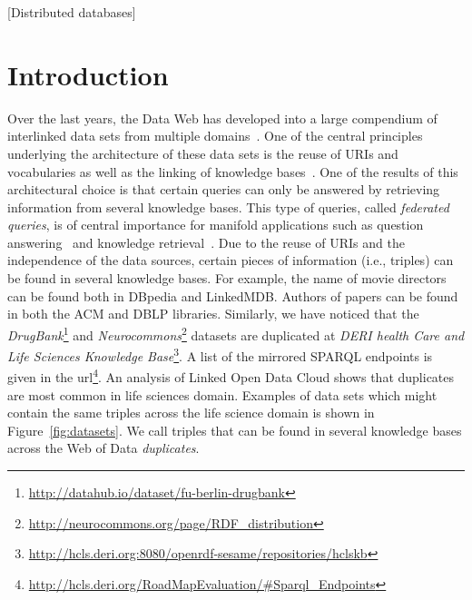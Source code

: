 \documentclass{sig-alternate}  %
\begin{document}
[Distributed databases]



\section{Introduction}
Over the last years, the Data Web has developed into a large compendium of interlinked data sets from multiple domains~\cite{key-14}. 
One of the central principles underlying the architecture of these data sets is the reuse of URIs and vocabularies as well as the linking of knowledge bases~\cite{key-20}.
One of the results of this architectural choice is that certain queries can only be answered by retrieving information from several knowledge bases.
This type of queries, called \emph{federated queries}, is of central importance for manifold applications such as question answering~\cite{UNG+12} and knowledge retrieval~\cite{SHE+11}.
Due to the reuse of URIs and the independence of the data sources, certain pieces of information (i.e., triples) can be found in several knowledge bases. 
For example, the name of movie directors can be found both in DBpedia and LinkedMDB.
Authors of papers can be found in both the ACM and DBLP libraries. 
Similarly, we have noticed that the \emph{DrugBank}\footnote{\url{http://datahub.io/dataset/fu-berlin-drugbank}} and \emph{Neurocommons}\footnote{\url{http://neurocommons.org/page/RDF_distribution}} datasets are duplicated at \emph{DERI health Care and Life Sciences Knowledge Base}\footnote{\url{http://hcls.deri.org:8080/openrdf-sesame/repositories/hclskb}}. A list of the mirrored SPARQL endpoints is given in the url\footnote{\url{http://hcls.deri.org/RoadMapEvaluation/\#Sparql_Endpoints}}. 
An analysis of Linked Open Data Cloud shows that duplicates are most common in life sciences domain. 
Examples of data sets which might contain the same triples across the life science domain is shown in Figure~\ref{fig:datasets}. 
We call triples that can be found in several knowledge bases across the Web of Data \emph{duplicates}.
\end{document}
